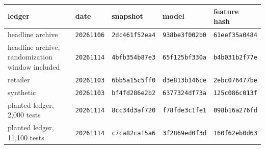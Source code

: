 \begin{tabular}{lllll}
\toprule
ledger & date & snapshot & model & feature hash \\
\midrule
headline archive & \texttt{20261106} & \texttt{2dc461f52ea4} & \texttt{938be3f002b0} & \texttt{61eef35a0484} \\
headline archive, randomization window included & \texttt{20261114} & \texttt{4bfb354b87e3} & \texttt{65f125bf330a} & \texttt{b4b031b2f77e} \\
retailer & \texttt{20261103} & \texttt{6bb5a15c5ff0} & \texttt{d3e813b146ce} & \texttt{2ebc076477be} \\
synthetic & \texttt{20261103} & \texttt{bf4fd286e2b2} & \texttt{6377324df73a} & \texttt{125c086c013f} \\
planted ledger, 2,000 tests & \texttt{20261114} & \texttt{8cc34d3af720} & \texttt{f78fde3c1fe1} & \texttt{098b16a276fd} \\
planted ledger, 11,100 tests & \texttt{20261114} & \texttt{c7ca82ca15a6} & \texttt{3f2869ed0f3d} & \texttt{160f62eb0d63} \\
\bottomrule
\end{tabular}
